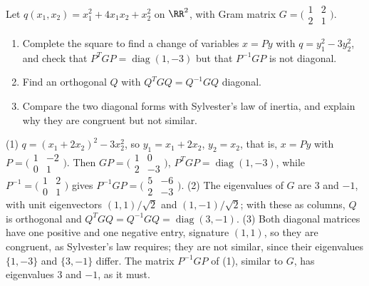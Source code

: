\begin{exercise}\label{linear-algebra:exercise-change-of-variables}
Let $q(x_1, x_2) = x_1^2 + 4x_1x_2 + x_2^2$ on $\RR^2$, with Gram matrix $G = \bigl(\begin{smallmatrix}1 & 2\\ 2 & 1\end{smallmatrix}\bigr)$.
\begin{enumerate}
\item Complete the square to find a change of variables $x = Py$ with $q = y_1^2 - 3y_2^2$, and check that $P^TGP = \operatorname{diag}(1, -3)$ but that $P^{-1}GP$ is not diagonal.
\item Find an orthogonal $Q$ with $Q^TGQ = Q^{-1}GQ$ diagonal.
\item Compare the two diagonal forms with Sylvester's law of inertia, and explain why they are congruent but not similar.
\end{enumerate}
\end{exercise}

\begin{solution}
(1) $q = (x_1 + 2x_2)^2 - 3x_2^2$, so $y_1 = x_1 + 2x_2$, $y_2 = x_2$, that is, $x = Py$ with $P = \bigl(\begin{smallmatrix}1 & -2\\ 0 & 1\end{smallmatrix}\bigr)$. Then
$GP = \bigl(\begin{smallmatrix}1 & 0\\ 2 & -3\end{smallmatrix}\bigr)$, $P^TGP = \operatorname{diag}(1, -3)$, while $P^{-1} = \bigl(\begin{smallmatrix}1 & 2\\ 0 & 1\end{smallmatrix}\bigr)$ gives
$P^{-1}GP = \bigl(\begin{smallmatrix}5 & -6\\ 2 & -3\end{smallmatrix}\bigr)$.
(2) The eigenvalues of $G$ are $3$ and $-1$, with unit eigenvectors $(1, 1)/\sqrt2$ and $(1, -1)/\sqrt2$; with these as columns, $Q$ is orthogonal and $Q^TGQ = Q^{-1}GQ = \operatorname{diag}(3, -1)$.
(3) Both diagonal matrices have one positive and one negative entry, signature $(1, 1)$, so they are congruent, as Sylvester's law requires; they are not similar, since their eigenvalues
$\{1, -3\}$ and $\{3, -1\}$ differ. The matrix $P^{-1}GP$ of (1), similar to $G$, has eigenvalues $3$ and $-1$, as it must.
\end{solution}

